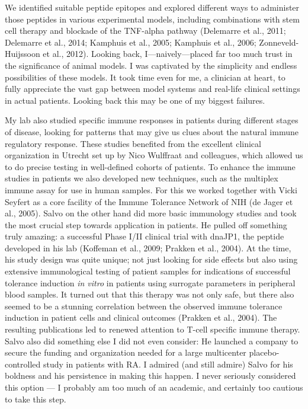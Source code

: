 \documentclass[authordate, editorial, issue]{jote-new-article}
\begin{document}
	We identified suitable peptide epitopes and explored different ways to administer those peptides in various experimental models, including combinations with stem cell therapy and blockade of the TNF-alpha pathway (Delemarre et al., 2011; Delemarre et al., 2014; Kamphuis et al., 2005; Kamphuis et al., 2006; Zonneveld-Huijssoon et al., 2012). Looking back, I—naively—placed far too much trust in the significance of animal models. I was captivated by the simplicity and endless possibilities of these models. It took time even for me, a clinician at heart, to fully appreciate the vast gap between model systems and real-life clinical settings in actual patients. Looking back this may be one of my biggest failures.







	My lab also studied specific immune responses in patients during different stages of disease, looking for patterns that may give us clues about the natural immune regulatory response. These studies benefited from the excellent clinical organization in Utrecht set up by Nico Wulffraat and colleagues, which allowed us to do precise testing in well-defined cohorts of patients. To enhance the immune studies in patients we also developed new techniques, such as the multiplex immune assay for use in human samples. For this we worked together with Vicki Seyfert as a core facility of the Immune Tolerance Network of NIH (de Jager et al., 2005). Salvo on the other hand did more basic immunology studies and took the most crucial step towards application in patients. He pulled off something truly amazing: a successful Phase I/II clinical trial with dnaJP1, the peptide developed in his lab (Koffeman et al., 2009; Prakken et al., 2004). At the time, his study design was quite unique; not just looking for side effects but also using extensive immunological testing of patient samples for indications of successful tolerance induction \emph{in vitro} in patients using surrogate parameters in peripheral blood samples. It turned out that this therapy was not only safe, but there also seemed to be a stunning correlation between the observed immune tolerance induction in patient cells and clinical outcomes (Prakken et al., 2004). The resulting publications led to renewed attention to T-cell specific immune therapy. Salvo also did something else I did not even consider: He launched a company to secure the funding and organization needed for a large multicenter placebo-controlled study in patients with RA. I admired (and still admire) Salvo for his boldness and his persistence in making this happen. I never seriously considered this option — I probably am too much of an academic, and certainly too cautious to take this step.
\end{document}
